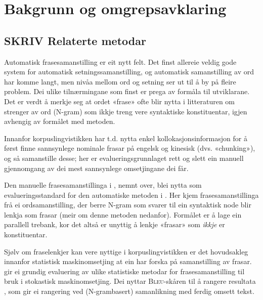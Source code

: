 \documentclass[11pt,a4paper,oneside,draft]{book}
\newcommand{\Bleu}{\textsc{Bleu}}
\begin{document}
\chapter{Bakgrunn og omgrepsavklaring}
\label{sec-2}

  \label{SEC:bakgrunn}
\section{\textbf{SKRIV} Relaterte metodar}
\label{sec-2.1}

Automatisk frasesamanstilling er eit nytt felt. Det finst allereie
veldig gode system for automatisk setningssamanstilling, og automatisk
samanstilling av ord har komme langt, men nivåa mellom ord og setning
ser ut til å by på fleire problem.  Dei ulike tilnærmingane
som finst er prega av formåla til utviklarane. Det er verdt å merkje
seg at ordet «frase» ofte blir nytta i litteraturen om strenger av ord
(N-gram) som ikkje treng vere syntaktiske konstituentar, igjen
avhengig av formålet med metoden.

Innanfor korpuslingvistikken har t.d. \citet{piao2001mwu} nytta enkel
kollokasjonsinformasjon for å først finne sannsynlege nominale frasar
på engelsk og kinesisk (dvs. «chunking»), og så samanstille desse; her
er evalueringsgrunnlaget rett og slett ein manuell gjennomgang av dei
mest sannsynlege omsetjingane dei får. 

Den manuelle frasesamanstillinga i \citet{samuelsson2006pap}, nemnt
over, blei nytta som evalueringsstandard for den automatiske metoden i
\citet{samuelsson2007apa}.  Her kjem frasesamanstillinga frå ei
ordsamanstilling, der berre N-gram som svarer til ein syntaktisk node
blir lenkja som frasar (meir om denne metoden nedanfor). Formålet er å
lage ein parallell trebank, kor det altså er unyttig å lenkje «frasar»
som \emph{ikkje} er konstituentar.

Sjølv om fraselenkjer kan vere nyttige i korpuslingvistikken er det
hovudsakleg innanfor statistisk maskinomsetjing at ein har forska på
samanstilling av frasar. \citet{koehn2003spb} gir ei grundig
evaluering av ulike statistiske metodar for frasesamanstilling til
bruk i stokastisk maskinomsetjing. Dei nyttar \Bleu-skåren til å
rangere resultata
\citep[Papineni~et~al.,~2001,~i][s.~51]{koehn2003spb}, som gir ei
rangering ved (N-grambasert) samanlikning med ferdig omsett tekst.
\end{document}
